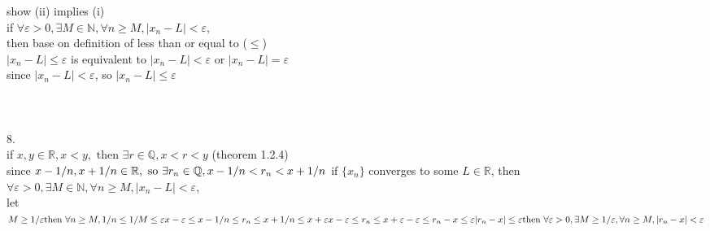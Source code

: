 \documentclass[12pt, border = 4pt, multi]{article} %
\begin{document}
show (ii) implies (i)\\
if $\forall \varepsilon > 0, \exists M \in \mathbb{N}, \forall n \geq M, |x_n - L| < \varepsilon$,\\
then base on definition of less than or equal to ($\leq$)\\
$|x_n - L| \leq \varepsilon$ is equivalent to $|x_n - L| < \varepsilon$ or $|x_n - L| = \varepsilon$\\
since $|x_n - L| < \varepsilon$, so $|x_n - L| \leq \varepsilon$\\
\\
\\
\\
8.\\
if $x, y \in \mathbb{R}, x < y, \text{ then } \exists r \in \mathbb{Q}, x < r < y$ \qquad (theorem 1.2.4)\\
since $x - 1 / n, x + 1 / n \in \mathbb{R}, \text{ so } \exists r_n \in \mathbb{Q}, x - 1 / n < r_n < x + 1 / n\\$
if $\{x_n\}$ converges to some $L \in \mathbb{R}$, then $\forall \varepsilon > 0, \exists M \in \mathbb{N}, \forall n \geq M, |x_n - L| < \varepsilon$,\\
let $M \geq 1 / \varepsilon\\
\text{then } \forall n \geq M, 1 / n \leq 1 / M \leq \varepsilon\\
x - \varepsilon \leq x - 1 / n \leq r_n \leq x + 1 / n \leq x + \varepsilon\\
x - \varepsilon \leq r_n \leq x + \varepsilon\\
-\varepsilon \leq r_n - x \leq \varepsilon\\
|r_n - x| \leq \varepsilon\\
\text{then }\forall \varepsilon > 0, \exists M \geq 1 / \varepsilon, \forall n \geq M, |r_n - x| < \varepsilon$
\end{document}

